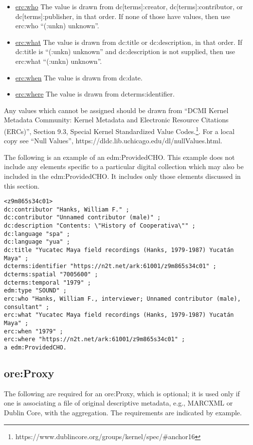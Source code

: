 \documentclass[11pt]{article}
\begin{document}
\begin{itemize}
\item \underline{erc:who} The value is drawn from dc[terms]:creator, dc[terms]:contributor, or dc[terms]:publisher, in that order. If none of those have values, then use erc:who ``(:unkn) unknown''.
\item \underline{erc:what} The value is drawn from dc:title or dc:description, in that order. If dc:title is ``(:unkn) unknown'' and dc:description is not supplied, then use erc:what ``(:unkn) unknown''.
\item \underline{erc:when} The value is drawn from dc:date.
\item \underline{erc:where} The value is drawn from dcterms:identifier.
\end{itemize}

Any values which cannot be assigned should be drawn from ``DCMI Kernel Metadata Community: Kernel Metadata and Electronic Resource Citations (ERCs)'', Section 9.3, Special Kernel Standardized Value Codes.\footnote{https://www.dublincore.org/groups/kernel/spec/\#anchor16}. For a local copy see ``Null Values'', https://dldc.lib.uchicago.edu/dl/nullValues.html.

The following is an example of an edm:ProvidedCHO. This example does not include any elements specific to a particular digital collection which may also be included in the edm:ProvidedCHO. It includes only those elements discussed in this section.

\begin{verbatim}
<z9m865s34c01>
dc:contributor "Hanks, William F." ;
dc:contributor "Unnamed contributor (male)" ;
dc:description "Contents: \"History of Cooperativa\"" ;
dc:language "spa" ;
dc:language "yua" ;
dc:title "Yucatec Maya field recordings (Hanks, 1979-1987) Yucatán Maya" ;
dcterms:identifier "https://n2t.net/ark:61001/z9m865s34c01" ;
dcterms:spatial "7005600" ;
dcterms:temporal "1979" ;
edm:type "SOUND" ;
erc:who "Hanks, William F., interviewer; Unnamed contributor (male), consultant" ;
erc:what "Yucatec Maya field recordings (Hanks, 1979-1987) Yucatán Maya" ;
erc:when "1979" ;
erc:where "https://n2t.net/ark:61001/z9m865s34c01" ;
a edm:ProvidedCHO.
\end{verbatim}

\subsection{ore:Proxy}

The following are required for an ore:Proxy, which is optional; it is used only if one is associating a file of original descriptive metadata, e.g., MARCXML or Dublin Core, with the aggregation. The requirements are indicated by example. 
\end{document}
